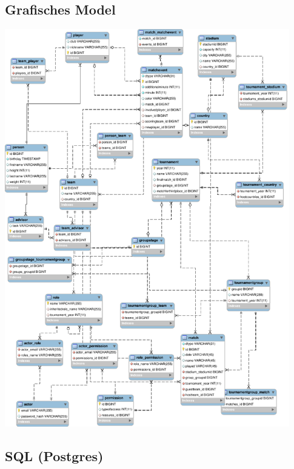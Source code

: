 \documentclass[11pt,german]{scrartcl}
\begin{document}
\subsection*{Grafisches Model}
\begin{center}
\leavevmode
\includegraphics[width=0.93\textwidth]{../diagrams/relationales_schema.pdf}
\end{center}

\subsection*{SQL (Postgres)}



%
\end{document}

